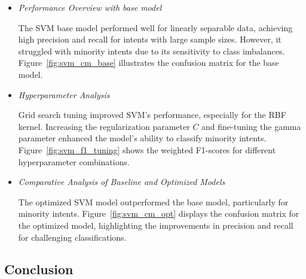             \begin{itemize}
        
                \item \textit{Performance Overview with base model}
                
                    \vspace{0.3em}

                    The SVM base model performed well for linearly separable data, achieving high precision and recall for intents with large sample sizes. However, it struggled with minority intents due to its sensitivity to class imbalances. Figure~\ref{fig:svm_cm_base} illustrates the confusion matrix for the base model.

                \vspace{0.5em}

                \item \textit{Hyperparameter Analysis}
                
                    \vspace{0.3em}

                    Grid search tuning improved SVM's performance, especially for the RBF kernel. Increasing the regularization parameter \( C \) and fine-tuning the gamma parameter enhanced the model's ability to classify minority intents. Figure~\ref{fig:svm_f1_tuning} shows the weighted F1-scores for different hyperparameter combinations.

                \vspace{0.5em}

                \item \textit{Comparative Analysis of Baseline and Optimized Models}
                
                    \vspace{0.3em}

                    The optimized SVM model outperformed the base model, particularly for minority intents. Figure~\ref{fig:svm_cm_opt} displays the confusion matrix for the optimized model, highlighting the improvements in precision and recall for challenging classifications.

            \end{itemize}

    \subsection{Conclusion} %
    
